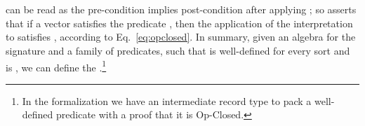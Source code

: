 \begin{code}
\>[0]\AgdaSpace{}%
\AgdaSymbol{:}\AgdaSpace{}%
\AgdaSpace{}%
\AgdaSymbol{\{}\AgdaSymbol{\}}\AgdaSpace{}%
\AgdaSpace{}%
\AgdaSymbol{(}\AgdaSpace{}%
\AgdaSymbol{:}\AgdaSpace{}%
\AgdaSpace{}%
\AgdaSymbol{)}\AgdaSpace{}%
\AgdaSpace{}%
\AgdaSymbol{(}\AgdaSpace{}%
\AgdaSymbol{:}\AgdaSpace{}%
\AgdaSpace{}%
\AgdaSymbol{(}\AgdaSpace{}%
\AgdaSymbol{)}\AgdaSpace{}%
\AgdaUnderscore{}\AgdaSymbol{)}\AgdaSpace{}%
\AgdaSpace{}%
\AgdaSpace{}%
\AgdaSymbol{\AgdaUnderscore{}}\<%
\\
\>[0]\AgdaSpace{}%
\AgdaSpace{}%
\AgdaSymbol{=}\AgdaSpace{}%
\AgdaSpace{}%
\AgdaSymbol{\{}\AgdaSpace{}%
\AgdaSymbol{\}}\AgdaSpace{}%
\AgdaSymbol{(}\AgdaSpace{}%
\AgdaSymbol{:}\AgdaSpace{}%
\AgdaSpace{}%
\AgdaSpace{}%
\AgdaSymbol{(}\AgdaSpace{}%
\AgdaOperator{\AgdaInductiveConstructor{,}}\AgdaSpace{}%
\AgdaSymbol{))}\AgdaSpace{}%
\AgdaSpace{}%
\AgdaSymbol{(}\AgdaSpace{}%
\AgdaSymbol{*}\AgdaSpace{}%
\AgdaSpace{}%
\AgdaSpace{}%
\AgdaSymbol{)}\AgdaSpace{}%
\AgdaSymbol{(}\AgdaSpace{}%
\AgdaSpace{}%
\AgdaSpace{}%
\AgdaSpace{}%
\AgdaSymbol{)}\<%
\\
\end{code}
\noindent
\AgdaSymbol{(}\AgdaSymbol{)}\AgdaSpace{}
can be read as the pre-condition  implies post-condition
 after applying ; so
\AgdaSpace{}\AgdaSpace{}
asserts that if a vector  satisfies the predicate
, then the application of the interpretation
\AgdaSpace{}%
\AgdaSpace{}%
\AgdaSpace{}%
 to  satisfies
, according to Eq.~\eqref{eq:opclosed}.  In summary,
given an algebra  for the signature  and a
family  of predicates, such that
\AgdaSpace{} is well-defined for every sort
 and  is , we can
define the
\AgdaSpace{}\AgdaSpace{}.\footnote{In
  the formalization we have an intermediate record type
   to pack a well-defined predicate with a proof
  that it is Op-Closed.}


